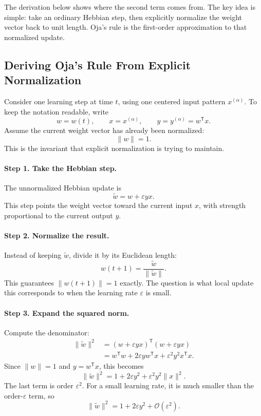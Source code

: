 The derivation below shows where the second term comes from. The key idea is simple: take an ordinary Hebbian step, then explicitly normalize the weight vector back to unit length. Oja's rule is the first-order approximation to that normalized update.

\subsection{Deriving Oja's Rule From Explicit Normalization}

Consider one learning step at time \(t\), using one centered input pattern \(x^{(\alpha)}\). To keep the notation readable, write
\[
  w=w(t),
  \qquad
  x=x^{(\alpha)},
  \qquad
  y=y^{(\alpha)}=w^{\mathsf{T}}x.
\]
Assume the current weight vector has already been normalized:
\[
  \|w\|=1.
\]
This is the invariant that explicit normalization is trying to maintain.

\paragraph{Step 1. Take the Hebbian step.}
The unnormalized Hebbian update is
\[
  \tilde{w}
  =
  w+\varepsilon yx.
\]
This step points the weight vector toward the current input \(x\), with strength proportional to the current output \(y\).

\paragraph{Step 2. Normalize the result.}
Instead of keeping \(\tilde{w}\), divide it by its Euclidean length:
\[
  w(t+1)
  =
  \frac{\tilde{w}}{\|\tilde{w}\|}.
\]
This guarantees \(\|w(t+1)\|=1\) exactly. The question is what local update this corresponds to when the learning rate \(\varepsilon\) is small.

\paragraph{Step 3. Expand the squared norm.}
Compute the denominator:
\[
\begin{aligned}
  \|\tilde{w}\|^2
  &=
  (w+\varepsilon yx)^{\mathsf{T}}
  (w+\varepsilon yx)\\
  &=
  w^{\mathsf{T}}w
  +2\varepsilon y w^{\mathsf{T}}x
  +\varepsilon^2 y^2 x^{\mathsf{T}}x.
\end{aligned}
\]
Since \(\|w\|=1\) and \(y=w^{\mathsf{T}}x\), this becomes
\[
  \|\tilde{w}\|^2
  =
  1+2\varepsilon y^2+\varepsilon^2y^2\|x\|^2.
\]
The last term is order \(\varepsilon^2\). For a small learning rate, it is much smaller than the order-\(\varepsilon\) term, so
\[
  \|\tilde{w}\|^2
  =
  1+2\varepsilon y^2+\mathcal{O}(\varepsilon^2).
\]

